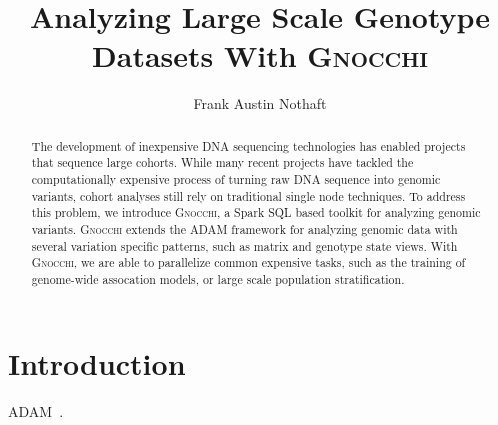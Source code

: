 \documentclass[11pt]{article} %
\begin{document}
\title{Analyzing Large Scale Genotype Datasets With \textsc{Gnocchi}}
\author{Frank Austin Nothaft} 
\date{}

\maketitle

\begin{abstract}
The development of inexpensive DNA sequencing technologies has enabled projects
that sequence large cohorts. While many recent projects have tackled the
computationally expensive process of turning raw DNA sequence into genomic
variants, cohort analyses still rely on traditional single node techniques. To
address this problem, we introduce \textsc{Gnocchi}, a Spark SQL based toolkit
for analyzing genomic variants. \textsc{Gnocchi} extends the \textsc{ADAM}
framework for analyzing genomic data with several variation specific patterns,
such as matrix and genotype state views. With \textsc{Gnocchi}, we are able to
parallelize common expensive tasks, such as the training of genome-wide
assocation models, or large scale population stratification.
\end{abstract}

\section{Introduction}

ADAM~\cite{massie13, nothaft15}.



\end{document}
